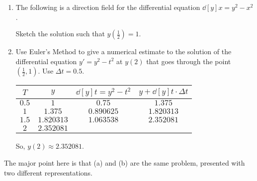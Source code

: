 \documentclass[]{ximera}
\begin{document}
\begin{problem}
	
	\begin{enumerate}
	\item  The following is a direction field for the differential equation $\dd[y]{x} = y^2 - x^2$.
	
		
		Sketch the solution such that $y\left( \frac{1}{2} \right) = 1$.
	\begin{freeResponse}
	\end{freeResponse}
	
	
	
	\item  Use Euler's Method to give a numerical estimate to the solution of the differential equation $y' = y^2 - t^2$ at $y(2)$ that goes through the point $\left( \frac{1}{2}, 1 \right)$.  
	Use $\Delta t = 0.5$.
	\begin{freeResponse}
	
		\begin{tabular}{|c|c|c|c|}
		\hline
		 $T$ 	& 	$y$ 	 & 	$\dd[y]{t}=y^2-t^2$ 	 &	$y + \dd[y]{t} \cdot \Delta t$   	\\
		 \hline
		 $0.5$	&	$1$	  &	$0.75$		  	&	$1.375$	\\
		 \hline
		 $1$	&	$1.375$  &	$0.890625$		  	&	$1.820313$   \\
		 \hline
		 $1.5$	&	$1.820313$  &	$1.063538$		&	$2.352081$    \\
		 \hline
		 $2$	&	$2.352081$  &  &    \\
		 \hline
		\end{tabular}
		
	So, $y(2) \approx 2.352081$.
	\end{freeResponse}
	\end{enumerate}
	
\end{problem}

\begin{instructorNotes}
The major point here is that (a) and (b) are the same problem, presented with two different representations.
\end{instructorNotes}
\end{document}
